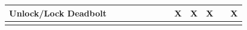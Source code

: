 \begin{table}[htb]
\begin{tabular}{lccclllllllll}
\multicolumn{1}{|l|}{Unlock/Lock Deadbolt} & \multicolumn{1}{l|}{}  & \multicolumn{1}{l|}{}  & \multicolumn{1}{l|}{}  & \multicolumn{1}{l|}{}  & \multicolumn{1}{l|}{}  & \multicolumn{1}{l|}{}  & \multicolumn{1}{l|}{}  & \multicolumn{1}{l|}{X} & \multicolumn{1}{l|}{X} & \multicolumn{1}{l|}{X}  & \multicolumn{1}{l|}{}   & \multicolumn{1}{l|}{X}  \\ \hline
\label{table: Traceability Matrix}
\end{tabular}
\end{table}